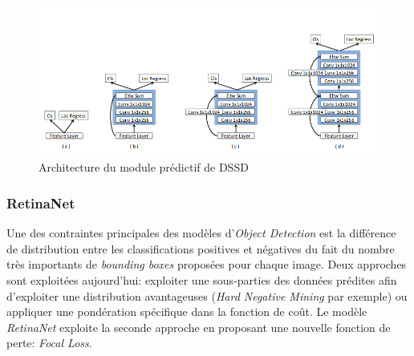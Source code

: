 \begin{figure}
\centering
\includegraphics[scale=0.4]{./tex/computer-vision/sota/predmoddssd.png}
\caption{Architecture du module prédictif de DSSD}
\label{predmoddssd}
\end{figure}

\subsubsection{RetinaNet}
Une des contraintes principales des modèles d'\textit{Object Detection} est la différence de distribution entre les classifications positives et négatives du fait du nombre très importants de \textit{bounding boxes} proposées pour chaque image. Deux approches sont exploitées aujourd'hui: exploiter une sous-parties des données prédites afin d'exploiter une distribution avantageuses (\textit{Hard Negative Mining} par exemple) ou appliquer une pondération spécifique dans la fonction de coût. Le modèle \textit{RetinaNet}\cite{retinanet} exploite la seconde approche en proposant une nouvelle fonction de perte: \textit{Focal Loss}.

